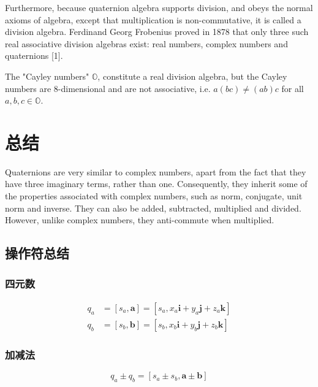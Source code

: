 Furthermore, because quaternion algebra supports division, and obeys the normal axioms of algebra, except that multiplication is non-commutative, it is called a division algebra. Ferdinand Georg Frobenius proved in 1878 that only three such real associative division algebras exist: real numbers, complex numbers and quaternions [1].

The "Cayley numbers" $\mathbb{O}$, constitute a real division algebra, but the Cayley numbers are 8-dimensional and are not associative, i.e. $a(b c) \neq(a b) c$ for all $a, b, c \in \mathbb{O}$.

\section{总结}
Quaternions are very similar to complex numbers, apart from the fact that they have three imaginary terms, rather than one. Consequently, they inherit some of the properties associated with complex numbers, such as norm, conjugate, unit norm and inverse. They can also be added, subtracted, multiplied and divided. However, unlike complex numbers, they anti-commute when multiplied.

\subsection{操作符总结}
\subsubsection*{四元数}
$$
\begin{aligned}
q_{a} & =\left[s_{a}, \mathbf{a}\right]=\left[s_{a}, x_{a} \mathbf{i}+y_{a} \mathbf{j}+z_{a} \mathbf{k}\right] \\
q_{b} & =\left[s_{b}, \mathbf{b}\right]=\left[s_{b}, x_{b} \mathbf{i}+y_{b} \mathbf{j}+z_{b} \mathbf{k}\right]
\end{aligned}
$$

\subsubsection*{加减法}
$$
q_{a} \pm q_{b}=\left[s_{a} \pm s_{b}, \mathbf{a} \pm \mathbf{b}\right]
$$


